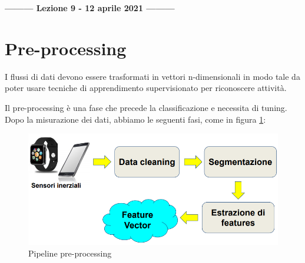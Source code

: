\begin{center}
    \textbf{--------- Lezione 9 - 12 aprile 2021 ---------}
\end{center}

\section{Pre-processing}
I flussi di dati devono essere trasformati in vettori n-dimensionali in modo tale da poter usare tecniche di apprendimento supervisionato per riconoscere attività.

Il pre-processing è una fase che precede la classificazione e necessita di tuning. 
Dopo la misurazione dei dati, abbiamo le seguenti fasi, come in figura \ref{fig:pipeline}:
\begin{figure}[!ht]
    \centering
    \includegraphics[width=.6\textwidth]{images/MobiDEV/6. activity recognition/pre-processing pipeline.PNG}
    \caption{Pipeline pre-processing}
    \label{fig:pipeline}
\end{figure}

